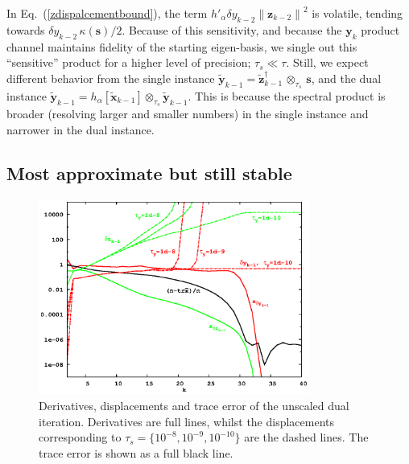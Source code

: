 \documentclass[letterpaper,twocolumn,amsmath,amsfont,amssymb,english,aps,jcp,preprintnumbers,groupaddress,nofootinbib,tightenlines,floatfix]{revtex4}
\newcommand{\mat}[1]{\boldsymbol{#1}}
\newcommand{\ots}{ {\scriptstyle \otimes}_{ \! \tau_s } }
\theoremstyle{plain}
\theoremstyle{remark}
\theoremstyle{plain}
\begin{document}
In Eq.~(\ref{zdispalcementbound}),  the term $h'_\alpha  \delta y_{k-2} { \lVert \mat{z}_{k-2} \rVert }^2$ is volatile, tending towards
$\delta y_{k-2} \, \kappa(\mat{s})/2$.  Because of this sensitivity, and because the $\mat{y}_k$ product channel maintains fidelity 
of the starting eigen-basis, we single out this ``sensitive'' product for a higher level of precision; $\tau_s \ll \tau$.
Still, we expect different behavior from the single instance $\widetilde{\mat{y}}_{k-1} = \widetilde{\mat{z}}^{\dagger}_{k-1} \, \ots \, \mat{s}$,
and the dual instance $\widetilde{\mat{y}}_{k-1} =  h_\alpha [\widetilde{\mat{x}}_{k-1}]  \ots \widetilde{\mat{y}}_{k-1} $.
This is because the spectral product is broader (resolving larger and smaller numbers) 
in the single instance and narrower in the dual instance.

\subsection{Most approximate but still stable}

\begin{figure}[h]
\includegraphics[width=3.5in]{fig_33_tube_cond_10_noscaling_33_nanotube_cond10_noscale_dual.eps}
\caption{Derivatives, displacements and trace error of the unscaled dual iteration.
Derivatives are full lines, whilst the displacements corresponding to $\tau_s=\{10^{-8}, 10^{-9}, 10^{-10}\}$
are the dashed lines.  The trace error is shown as a full black line. } \label{flow_noscale_dual}
\end{figure}
\end{document}
